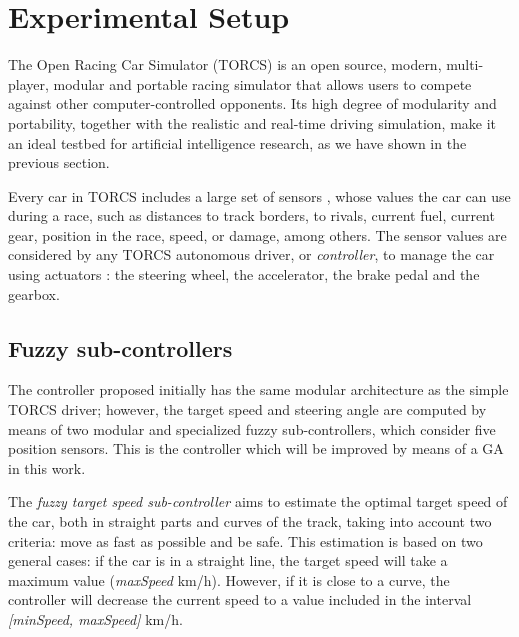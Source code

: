 \documentclass[conference]{IEEEtran}
\begin{document}

\section{Experimental Setup}
\label{sec:experimental_setup}

The Open Racing Car Simulator (TORCS) \cite{torcs4} is an open
source, modern, multi-player, modular and portable racing simulator
that allows users to compete against other computer-controlled opponents.
Its high degree of modularity and portability, together with the
realistic and real-time driving simulation, make it an ideal testbed
for artificial intelligence research, as we have shown in the previous section.

Every car in TORCS includes  a large set of sensors \cite{Torcs3},
whose values the car can use during a race, such as distances to track borders, to rivals, current fuel, current gear, position in the race, speed, or damage, among others.
The sensor values are considered by any TORCS autonomous driver, or
{\em controller}, to manage the car using actuators \cite{Torcs3}: the
steering wheel, the accelerator, the brake pedal and the gearbox.   



\subsection{Fuzzy sub-controllers}
\label{subsec:subcontrollers}

The controller proposed initially \cite{evo17} has the same modular
architecture as the simple TORCS driver; however, the target speed and
steering angle are computed by means of two modular and specialized
fuzzy sub-controllers, which consider five position sensors. This is
the controller which will be improved by means of a GA in this
work.

The {\em fuzzy target speed sub-controller} aims to estimate the
optimal target speed of the car, both in straight parts and curves of
the track, taking into account two criteria: move as fast as possible
and be safe. This estimation is based on two general cases: if the car
is in a straight line, the target speed will take a maximum value
(\textit{maxSpeed} km/h). However, if it is close to a curve, the
controller will decrease the current speed to a value included in the
interval \textit{[minSpeed, maxSpeed]} km/h. 
\end{document}
